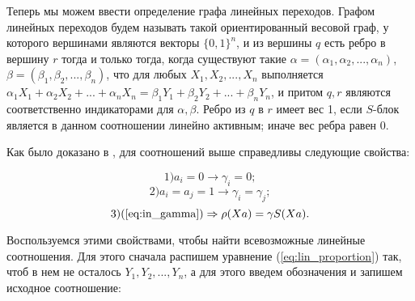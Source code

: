 \documentclass[a4paper,12pt]{report}
\theoremstyle{plain} %
\theoremstyle{definition}
\theoremstyle{remark}
\begin{document}
\begin{large}
Теперь мы можем ввести определение графа линейных переходов. Графом линейных переходов будем называть такой ориентированный весовой граф, у которого вершинами являются векторы $\{0, 1\}^n$, и из вершины $q$ есть ребро в вершину $r$ тогда и только тогда, когда существуют такие $\alpha = (\alpha_1, \alpha_2, ..., \alpha_n)$, $\beta = (\beta_1, \beta_2, ..., \beta_n)$, что для любых $X_1, X_2, ..., X_n$ выполняется $\alpha_1X_1 + \alpha_2X_2 + ... + \alpha_nX_n = \beta_1Y_1 + \beta_2Y_2 + ... + \beta_nY_n$, и притом $q, r$ являются соответственно индикаторами для $\alpha, \beta$. Ребро из $q$ в $r$ имеет вес 1, если $S$-блок является в данном соотношении линейно активным; иначе вес ребра равен 0.

Как было доказано в \cite{marchuk}, для соотношений выше справедливы следующие свойства:

 \begin{equation} \label{eq:lin_property1} 1) a_i = 0 \rightarrow \gamma_i = 0; \end{equation}
 \begin{equation} \label{eq:lin_property2} 2) a_i = a_j = 1 \rightarrow \gamma_i = \gamma_j; 
 \end{equation}
\begin{equation} \label{eq:lin_property3} 3)(\ref{eq:in_gamma}) \Rightarrow \rho (Xa) = \gamma S(Xa). \end{equation}

Воспользуемся этими свойствами, чтобы найти всевозможные линейные соотношения. Для этого сначала распишем уравнение (\ref{eq:lin_proportion}) так, чтоб в нем не осталось $Y_1, Y_2, ..., Y_n$, а для этого введем обозначения и запишем исходное соотношение:


\end{large}
\end{document}
